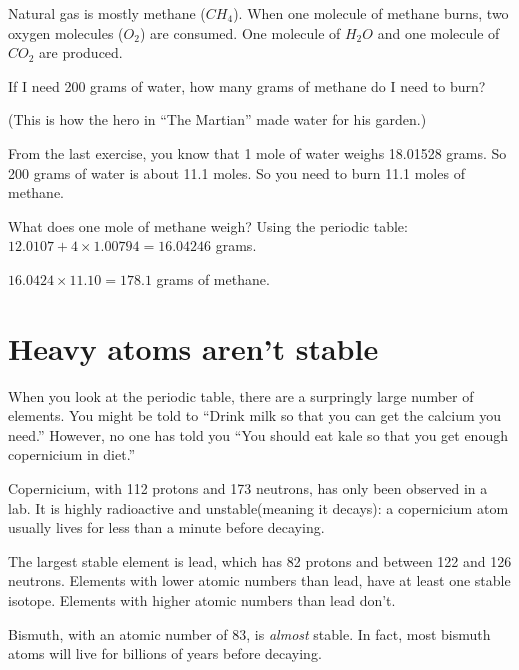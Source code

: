 \begin{Exercise}[title={Burning Methane}, label=burning_methane]
  
Natural gas is mostly methane ($CH_4$). When one molecule of methane
burns, two oxygen molecules ($O_2$) are consumed. One molecule of
$H_2O$ and one molecule of $CO_2$ are produced.

If I need 200 grams of water, how many grams of methane do I need
to burn?

(This is how the hero in ``The Martian'' made water for his garden.)

\end{Exercise}
\begin{Answer}[ref=burning_methane]

From the last exercise, you know that 1 mole of water weighs 18.01528
grams. So 200 grams of water is about 11.1 moles. So you need to burn
11.1 moles of methane.

What does one mole of methane weigh? Using the periodic table:
$12.0107 + 4 \times 1.00794 = 16.04246$ grams.

$16.0424 \times 11.10 = 178.1$ grams of methane.
   
\end{Answer}

\section{Heavy atoms aren't stable}

When you look at the periodic table, there are a surpringly large
number of elements. You might be told to ``Drink milk so that you can
get the calcium you need.'' However, no one has told you ``You should
eat kale so that you get enough copernicium in diet.''

Copernicium, with 112 protons and 173 neutrons, has only been observed
 in a lab. It is highly radioactive and unstable(meaning it decays): a copernicium
atom usually lives for less than a minute before decaying.

The largest stable element is lead, which has 82 protons and between
122 and 126 neutrons. Elements with lower atomic numbers than lead,
have at least one stable isotope. Elements with higher atomic numbers
than lead don't.

Bismuth, with an atomic number of 83, is \textit{almost} stable. In fact, most
bismuth atoms will live for billions of years before decaying.

